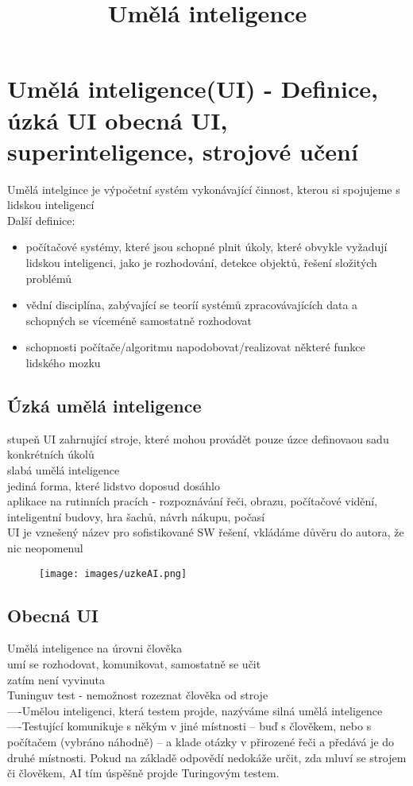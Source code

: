\title{Umělá inteligence}

\section{Umělá inteligence(UI) - Definice, úzká UI obecná UI, superinteligence, strojové učení}
Umělá intelgince je výpočetní systém vykonávající činnost, kterou si spojujeme s lidskou inteligencí\\
Další definice:
\begin{itemize}
    \item počítačové systémy, které jsou schopné plnit úkoly, které obvykle vyžadují lidskou inteligenci, jako je rozhodování, detekce objektů, řešení složitých problémů
    \item vědní disciplína, zabývající se teoríí systémů zpracovávajících data a schopných se víceméně samostatně rozhodovat
    \item schopnosti počítače/algoritmu napodobovat/realizovat některé funkce lidského mozku
\end{itemize}
\subsection{Úzká umělá inteligence}
stupeň UI zahrnující stroje, které mohou provádět pouze úzce definovaou sadu konkrétních úkolů\\
slabá umělá inteligence\\
jediná forma, které lidstvo doposud dosáhlo\\
aplikace na rutinních pracích - rozpoznávání řeči, obrazu, počítačové vidění, inteligentní budovy, hra šachů, návrh nákupu, počasí\\
UI je vznešený název pro sofistikované SW řešení, vkládáme důvěru do autora, že nic neopomenul\\
\begin{figure}[H]
    \texttt{[image: images/uzkeAI.png]}
\end{figure}
\subsection{Obecná UI}
Umělá inteligence na úrovni člověka\\
umí se rozhodovat, komunikovat, samostatně se učit\\
zatím není vyvinuta\\
Tuninguv test - nemožnost rozeznat člověka od stroje\\
----Umělou inteligenci, která testem projde, nazýváme silná umělá inteligence\\
----Testující komunikuje s někým v jiné místnosti – buď s člověkem, nebo s počítačem (vybráno náhodně) – a klade otázky v přirozené řeči a předává je do druhé místnosti. Pokud na základě odpovědí nedokáže určit, zda mluví se strojem či člověkem, AI tím úspěšně projde Turingovým testem.\\
